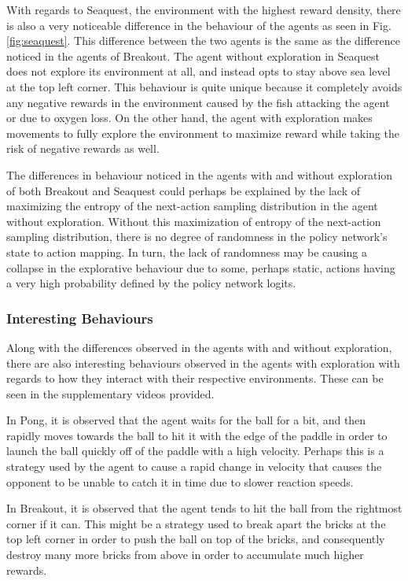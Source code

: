 \documentclass{article}
\begin{document}
With regards to Seaquest, the environment with the highest reward density, there is also a very noticeable difference in the behaviour of the agents as seen in Fig. \ref{fig:seaquest}. This difference between the two agents is the same as the difference noticed in the agents of Breakout. The agent without exploration in Seaquest does not explore its environment at all, and instead opts to stay above sea level at the top left corner. This behaviour is quite unique because it completely avoids any negative rewards in the environment caused by the fish attacking the agent or due to oxygen loss. On the other hand, the agent with exploration makes movements to fully explore the environment to maximize reward while taking the risk of negative rewards as well.

The differences in behaviour noticed in the agents with and without exploration of both Breakout and Seaquest could perhaps be explained by the lack of maximizing the entropy of the next-action sampling distribution in the agent without exploration. Without this maximization of entropy of the next-action sampling distribution, there is no degree of randomness in the policy network’s state to action mapping. In turn, the lack of randomness may be causing a collapse in the explorative behaviour due to some, perhaps static, actions having a very high probability defined by the policy network logits.

\subsubsection{Interesting Behaviours}

Along with the differences observed in the agents with and without exploration, there are also interesting behaviours observed in the agents with exploration with regards to how they interact with their respective environments. These can be seen in the supplementary videos provided.

In Pong, it is observed that the agent waits for the ball for a bit, and then rapidly moves towards the ball to hit it with the edge of the paddle in order to launch the ball quickly off of the paddle with a high velocity. Perhaps this is a strategy used by the agent to cause a rapid change in velocity that causes the opponent to be unable to catch it in time due to slower reaction speeds.

In Breakout, it is observed that the agent tends to hit the ball from the rightmost corner if it can. This might be a strategy used to break apart the bricks at the top left corner in order to push the ball on top of the bricks, and consequently destroy many more bricks from above in order to accumulate much higher rewards.
\end{document}
